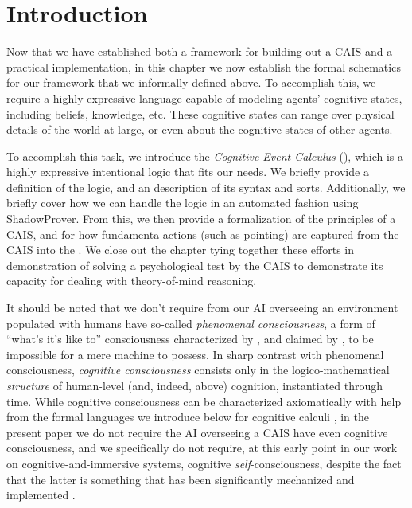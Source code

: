 \section{Introduction}

Now that we have established both a framework for building out a CAIS and
a practical implementation, in this chapter we now establish the formal
schematics for our framework that we informally defined above. To accomplish
this, we require a highly expressive language capable of modeling agents'
cognitive states, including beliefs, knowledge, etc. These cognitive states
can range over physical details of the world at large, or even about the
cognitive states of other agents.

To accomplish this task, we introduce the \textit{Cognitive Event
Calculus} (\CEC), which is a highly expressive intentional logic that fits
our needs. We briefly provide a definition of the logic, and an description
of its syntax and sorts. Additionally, we briefly cover how we can handle
the logic in an automated fashion using ShadowProver. From this, we then
provide a formalization of the principles of a CAIS, and for how fundamenta
actions (such as pointing) are captured from the CAIS into the \CEC. We
close out the chapter tying together these efforts in demonstration of
solving a psychological test by the CAIS to demonstrate its capacity
for dealing with theory-of-mind reasoning.

It should be noted that we don't require from our AI overseeing an
environment populated with humans have so-called
\textit{phenomenal consciousness}, a form of ``what's it's like to''
consciousness characterized by \cite{bbs.block}, and
claimed by \cite{sb_billion_conscious_robot}, to be impossible for a
mere machine to possess.  In sharp contrast with phenomenal
consciousness, \textit{cognitive consciousness} consists only in the
logico-mathematical \emph{structure} of human-level (and, indeed,
above) cognition, instantiated through time.  While cognitive
consciousness can be characterized axiomatically with help from the
formal languages we introduce below for cognitive calculi
\cite{axiomatizing_consciousness1}, in the present paper we do not
require the AI overseeing a CAIS have even cognitive consciousness,
and we specifically do not require, at this early point in our work
on cognitive-and-immersive systems, cognitive
\emph{self}-consciousness, despite the fact that the latter is
something that has been significantly mechanized and implemented
\cite{roman2015_robot_self-con,sb_on_knowledge_game}.